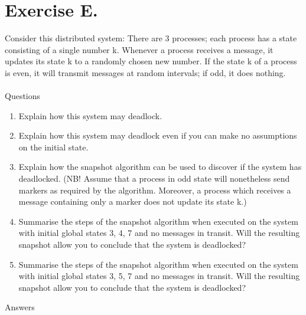 \section{Exercise E.}
Consider this distributed system: There are 3 processes; each process has a state consisting of a single number k. Whenever a process receives a message, it updates its state k to a randomly chosen new number. If the state k of a process is even, it will transmit messages at random intervals; if odd, it does nothing.\\\\
Questions
\begin{enumerate}
\item Explain how this system may deadlock.
\item Explain how this system may deadlock even if you can make no assumptions on the initial state.
\item Explain how the snapshot algorithm can be used to discover if the system has deadlocked. (NB! Assume that a process in odd state will nonetheless send markers as required by the algorithm. Moreover, a process which receives a message containing only a marker does not update its state k.)
\item Summarise the steps of the snapshot algorithm when executed on the system with initial global states 3, 4, 7 and no messages in transit. Will the resulting snapshot allow you to conclude that the system is deadlocked?
\item Summarise the steps of the snapshot algorithm when executed on the system with initial global states 3, 5, 7 and no messages in transit. Will the resulting snapshot allow you to conclude that the system is deadlocked?
\end{enumerate}
Answers
